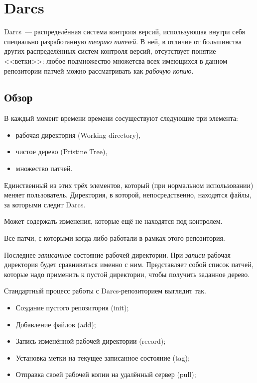 \section{Darcs}

Darcs~--- распределённая система контроля версий, использующая внутри
себя специально разработанную \emph{теорию патчей}. В ней, в отличие
от большинства других распределённых систем контроля версий,
отсутствует понятие <<ветки>>: любое подмножество множетсва всех
имеющихся в данном репозитории патчей можно рассматривать как
\emph{рабочую копию}.

\subsection{Обзор}

В каждый момент времени времени сосуществуют следующие три
элемента: %

\begin{itemize}
\item рабочая директория (Working directory),
\item чистое дерево (Pristine Tree),
\item множество патчей.
\end{itemize}

\begin{definition}
  Единственный из этих трёх элементов, который (при нормальном
  использовании) меняет пользователь. Директория, в которой,
  непосредственно, находятся файлы, за которыми следит Darcs.

  Может содержать изменения, которые ещё не находятся под контролем.
\end{definition}

\begin{definition}
  Все патчи, с которыми когда-либо работали в рамках этого репозитория.
\end{definition}

\begin{definition}
  Последнее \emph{записанное} состояние рабочей директории. При
  \emph{записи} рабочая директория будет сравниваться именно с ним.
  Представляет собой список патчей, которые надо применить к пустой
  директории, чтобы получить заданное дерево.
\end{definition}

Стандартный процесс работы с Darcs-репозиторием выглядит так. 

\begin{itemize}
\item Создание пустого репозитория (init);
\item Добавление файлов (add);
\item Запись изменённой рабочей директории (record);
\item Установка метки на текущее записанное состояние (tag);
\item Отправка своей рабочей копии на удалённый сервер (pull);
\end{itemize}

